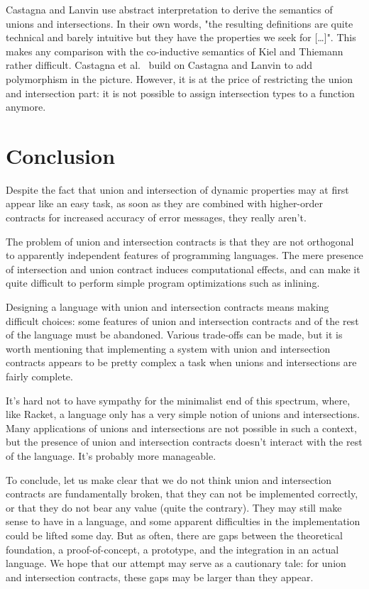 \documentclass[sigplan,10pt,review,anonymous]{acmart}
\begin{document}
Castagna and Lanvin use abstract interpretation to derive the semantics of
unions and intersections. In their own words, "the resulting definitions are
quite technical and barely intuitive but they have the properties we seek for
[\ldots]".  This makes any comparison with the co-inductive semantics of Kiel
and Thiemann rather difficult. Castagna et al.~\cite{gradualCastagna} build on
Castagna and Lanvin to add polymorphism in the picture. However, it is at the
price of restricting the union and intersection part: it is not possible to
assign intersection types to a function anymore.

\section{Conclusion}
\label{sec:conclusion}

Despite the fact that union and intersection of dynamic properties may
at first appear like an easy task, as soon as they are combined with
higher-order contracts for increased accuracy of error messages, they
really aren't.

The problem of union and intersection contracts is that they are not
orthogonal to apparently independent features of programming
languages. The mere presence of intersection and union contract
induces computational effects, and can make it quite difficult to
perform simple program optimizations such as inlining.

Designing a language with union and intersection contracts means
making difficult choices: some features of union and intersection
contracts and of the rest of the language must be abandoned. Various
trade-offs can be made, but it is worth mentioning that implementing a
system with union and intersection contracts appears to be pretty
complex a task when unions and intersections are fairly complete.

It's hard not to have sympathy for the minimalist end of this
spectrum, where, like Racket, a language only has a very simple notion
of unions and intersections. Many applications of unions and
intersections are not possible in such a context, but the presence of
union and intersection contracts doesn't interact with the rest of the
language. It's probably more manageable.

To conclude, let us make clear that we do not think union and intersection
contracts are fundamentally broken, that they can not be implemented correctly,
or that they do not bear any value (quite the contrary). They may still make
sense to have in a language, and some apparent difficulties in the
implementation could be lifted some day. But as often, there are gaps between
the theoretical foundation, a proof-of-concept, a prototype, and the integration
in an actual language. We hope that our attempt may serve as a cautionary tale:
for union and intersection contracts, these gaps may be larger than
they appear.


\end{document}
